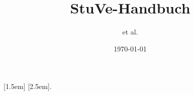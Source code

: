 \usepackage{perpage}


\title{StuVe-Handbuch}
\date{\today}
\author{et al.}

\usepackage[utf8]{inputenc}
\usepackage[T1]{fontenc}					%
\usepackage{lmodern}						%
\renewcommand{\familydefault}{\sfdefault}
\usepackage[ngerman]{babel}					%

\usepackage[left=2.2cm, right=2cm, top=1cm, bottom=1cm]{geometry}
\usepackage{layout}							%
\usepackage{totcount}						%

\usepackage[final]{pdfpages}
\usepackage{graphicx}



\addto\captionsngerman{\renewcommand{\chaptername}{Teil}}

\usepackage{titlesec}
\usepackage{fancyhdr}

\renewcommand*{\chaptermark}[1]{ \markboth{\thechapter: ##1}{} }%


\titleformat{\chapter}[display]{\normalfont\huge\bfseries}{\flushright \chaptertitlename\ \thechapter}{5pt}{\flushright \Huge}

\makeatletter
\newcommand*{\toccontents}{\@starttoc{toc}}
\makeatother

\usepackage{titletoc}

[1.5em]{\small}{\contentslabel{1em}}{}{\contentspage}
[2.5em]{\footnotesize}{\contentslabel{1em}}{}{\titlerule*[0.3pc].{}\contentspage}




